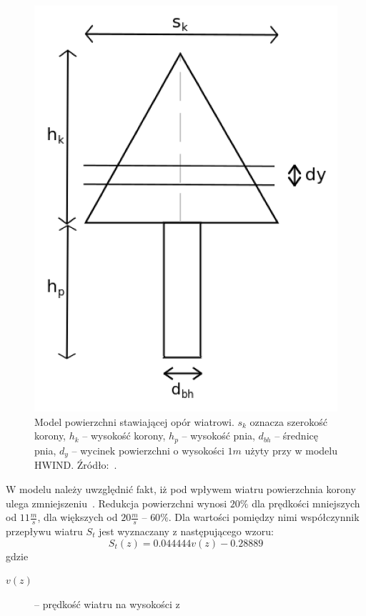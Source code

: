 \begin{figure}[!h]
\label{fig:hwindScheme2}
	\center
	\includegraphics[scale=0.35]{HWIND2}
	\caption{Model powierzchni stawiającej opór wiatrowi. $s_k$ oznacza szerokość korony, $h_k$ -- wysokość korony, $h_p$ -- wysokość pnia, $d_{bh}$ -- średnicę pnia, $d_y$ -- wycinek powierzchni o wysokości $1m$ użyty przy w modelu HWIND. Źródło:~\cite{chm_mgza}.}

\end{figure} 

W modelu należy uwzględnić fakt, iż pod wpływem wiatru powierzchnia korony ulega zmniejszeniu~\cite{hpsk_hwind}. Redukcja powierzchni wynosi $20\%$ dla prędkości mniejszych od $11 \frac{m}{s}$, dla 
większych od $20\frac{m}{s}$ -- $60\%$. Dla wartości pomiędzy nimi współczynnik przepływu wiatru $S_t$ jest wyznaczany z następującego wzoru:
\begin{equation}
\label{eq:windFlow}
	 S_t(z) = 0.044444v(z) - 0.28889
\end{equation}
gdzie
\begin{description}
	\item[$v(z)$] -- prędkość wiatru na wysokości z
\end{description}

